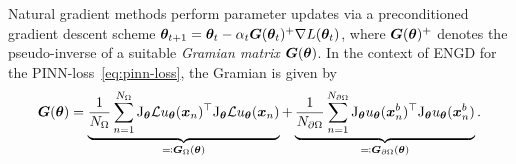 Natural gradient methods perform parameter updates via a preconditioned gradient descent scheme ${\bm{\theta}}_{t+1} = {\bm{\theta}}_t - \alpha_t {\bm{G}}({\bm{\theta}}_t)^+\nabla L({\bm{\theta}}_t)$, where ${\bm{G}}({\bm{\theta}})^+$ denotes the pseudo-inverse of a suitable \emph{Gramian matrix} ${\bm{G}}({\bm{\theta}})$. 
In the context of ENGD for the PINN-loss~\eqref{eq:pinn-loss}, the Gramian is given by 
\begin{equation}\label{eq:gramian}
  \mG(\vtheta) = %
  \underbrace{\frac1{{N_\Omega}} \sum_{n=1}^{N_\Omega} \jac_{\vtheta} \mathcal{L} u_\vtheta(\vx_n)^\top \jac_{\vtheta} \mathcal{L} u_\vtheta(\vx_n)}_{\eqqcolon \mG_\Omega(\vtheta)} + \underbrace{\frac1{{N_{\partial\Omega}}} \sum_{n=1}^{N_{\partial\Omega}} \jac_{\vtheta} u_\vtheta(\vx_n^b)^\top \jac_{\vtheta} u_\vtheta (\vx_n^b)}_{\eqqcolon \mG_{\partial\Omega}(\vtheta)}.
\end{equation}


